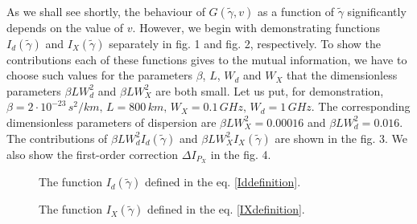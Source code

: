 \documentclass{article}
\begin{document}
As we shall see shortly, the behaviour of $G(\tilde{\gamma}, v)$ as a function of $\tilde{\gamma}$ significantly depends on the value of $v$. However, we begin with demonstrating functions $I_{d}(\tilde{\gamma})$ and $I_{X}(\tilde{\gamma})$ separately in fig. 1 and fig. 2, respectively. To show the contributions each of these functions gives to the mutual information, we have to choose such values for the parameters $\beta$, $L$, $W_{d}$ and $W_{X}$ that the dimensionless parameters $\beta L W_{d}^{2}$ and $\beta L W_{X}^{2}$ are both small. Let us put, for demonstration, $\beta = 2 \cdot 10^{-23}\,s^{2}/km,\, L = 800 \, km,\, W_{X} = 0.1 \, GHz,\, W_{d} = 1\, GHz$. The corresponding dimensionless parameters of dispersion are $\beta L W_{X}^{2} = 0.00016$ and $\beta L W_{d}^{2} = 0.016$.
The contributions of $\beta L W_{d}^{2}I_{d}(\tilde{\gamma})$ and $\beta L W_{X}^{2}I_{X}(\tilde{\gamma})$ are shown in the fig. 3. We also show the first-order correction $\Delta I_{P_{X}}$ in the fig. 4.

\begin{figure}[hbt!]
	\centering
	\caption{The function $I_{d}(\tilde{\gamma})$ defined in the eq. \eqref{Iddefinition}.} 
	\label{fig:2}
\end{figure}

\begin{figure}[hbt!]
	\centering
	\caption{The function $I_{X}(\tilde{\gamma})$ defined in the eq. \eqref{IXdefinition}.} 
	\label{fig:2}
\end{figure}
\end{document}

